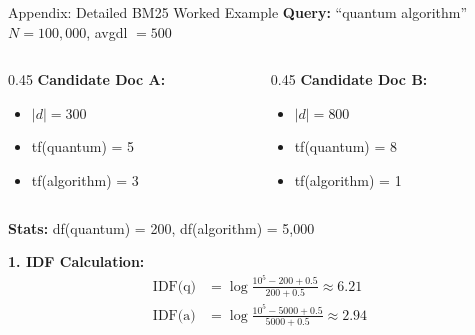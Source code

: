 \documentclass[aspectratio=169]{beamer}
\newif\ifanimated
\newcommand{\cpause}{\ifanimated\pause\fi}
\begin{document}
\begin{frame}[shrink=10]{Appendix: Detailed BM25 Worked Example}
\textbf{Query:} ``quantum algorithm'' \quad $N = 100{,}000$, avgdl $= 500$

\vspace{0.5em}

\begin{columns}
\begin{column}{0.45\textwidth}
\textbf{Candidate Doc A:}
\begin{itemize}
    \item $|d| = 300$
    \item tf(quantum) = 5
    \item tf(algorithm) = 3
\end{itemize}\cpause
\end{column}
\begin{column}{0.45\textwidth}
\textbf{Candidate Doc B:}
\begin{itemize}
    \item $|d| = 800$
    \item tf(quantum) = 8
    \item tf(algorithm) = 1
\end{itemize}\cpause
\end{column}
\end{columns}

\vspace{1em}

\textbf{Stats:} df(quantum) = 200, df(algorithm) = 5,000

\vspace{0.5em}

\textbf{1. IDF Calculation:}
\begin{align*}
\text{IDF(q)} &= \log\frac{10^5 - 200 + 0.5}{200 + 0.5} \approx \mathbf{6.21} \\
\text{IDF(a)} &= \log\frac{10^5 - 5000 + 0.5}{5000 + 0.5} \approx \mathbf{2.94}
\end{align*}
\end{frame}
\end{document}
